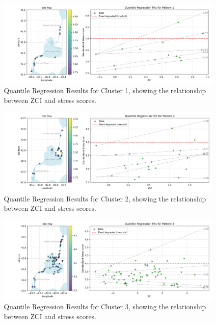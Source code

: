 \begin{figure}
\centering
\includegraphics[width=\textwidth]{../results/preliminary_results/qrm_quantile_regression_pattern_1.png}
\caption{Quantile Regression Results for Cluster 1, showing the relationship between ZCI and stress scores.}
\label{fig:qrm_quantile_regression_pattern_1}
\end{figure}

\begin{figure}
\centering
\includegraphics[width=\textwidth]{../results/preliminary_results/qrm_quantile_regression_pattern_2.png}
\caption{Quantile Regression Results for Cluster 2, showing the relationship between ZCI and stress scores.}
\label{fig:qrm_quantile_regression_pattern_2}
\end{figure}

\begin{figure}
\centering
\includegraphics[width=\textwidth]{../results/preliminary_results/qrm_quantile_regression_pattern_3.png}
\caption{Quantile Regression Results for Cluster 3, showing the relationship between ZCI and stress scores.}
\label{fig:qrm_quantile_regression_pattern_3}
\end{figure}

